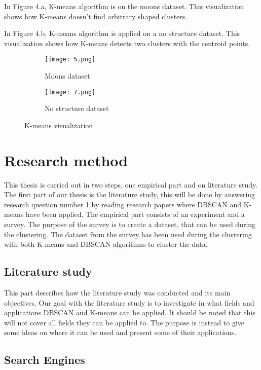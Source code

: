 \documentclass[a4paper]{article}
\begin{document}
In Figure 4.a, K-means algorithm is on the moons dataset. This visualization shows how K-means doesn't find arbitrary shaped clusters.

In Figure 4.b, K-means algorithm is applied on a no structure dataset. This visualization shows how K-means  detects two clusters with the centroid points.
\begin{figure}
\begin{subfigure}[h]{0.5\linewidth}
\texttt{[image: 5.png]}
\caption{Moons dataset}
\end{subfigure}
\hfill
\begin{subfigure}[h]{0.5\linewidth}
\texttt{[image: 7.png]}
\caption{No structure dataset}
\end{subfigure}%
\caption{K-means visualization}
\end{figure}\newpage


\newpage
\section{Research method}

This thesis is carried out in two steps, one empirical part and on literature study. The first part of our thesis is the literature study, this will be done by answering research question number 1 by reading research papers where DBSCAN and K-means have been applied. The empirical part consists of an experiment and a survey. The purpose of the survey is to create a dataset, that can be used during the clustering. The dataset from the survey has been used during the clustering with both K-means and DBSCAN algorithms to cluster the data.

\subsection{Literature study}

This part describes how the literature study was conducted and its main objectives. Our goal with the literature study is to investigate in what fields and applications DBSCAN and K-means can be applied.  It should be noted that this will not cover all fields they can be applied to. The purpose is instead to give some ideas on where it can be used and present some of their applications. 

\subsection{Search Engines}
\end{document}
